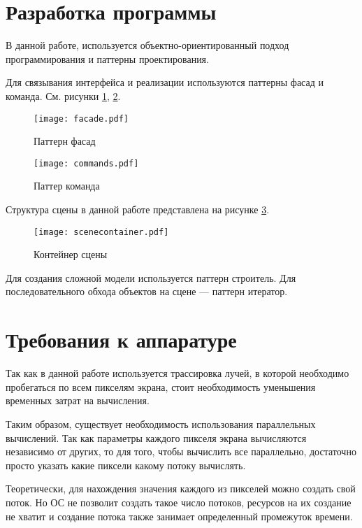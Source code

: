 \section{\textbf{Разработка программы}}

В данной работе, используется объектно-ориентированный подход программирования и паттерны проектирования\cite{patterns}. 

Для связывания интерфейса и реализации используются паттерны фасад и команда. См. рисунки \ref{img:facade}, \ref{img:commands}. 

\begin{figure}[H]
	\centering
	\texttt{[image: facade.pdf]}
	\caption{Паттерн фасад}
	\label{img:facade}
\end{figure}

\begin{figure}[H]
	\centering
	\texttt{[image: commands.pdf]}
	\caption{Паттер команда}
	\label{img:commands}
\end{figure}

Структура сцены в данной работе представлена на рисунке \ref{img:scenecontainer}. 

\begin{figure}[H]
	\centering
	\texttt{[image: scenecontainer.pdf]}
	\caption{Контейнер сцены}
	\label{img:scenecontainer}
\end{figure}

Для создания сложной модели используется паттерн строитель. Для последовательного обхода объектов на сцене --- паттерн итератор. 

\section{\textbf{Требования к аппаратуре }}

Так как в данной работе используется трассировка лучей, в которой необходимо пробегаться по всем пикселям экрана, стоит необходимость уменьшения временных затрат на вычисления. 

Таким образом, существует необходимость использования параллельных вычислений. Так как параметры каждого пикселя экрана вычисляются независимо от других, то для того, чтобы вычислить все параллельно, достаточно просто указать какие пиксели какому потоку вычислять.

Теоретически, для нахождения значения каждого из пикселей можно создать свой поток. Но ОС не позволит создать такое число потоков, ресурсов на их создание не хватит и создание потока также занимает определенный промежуток времени.

